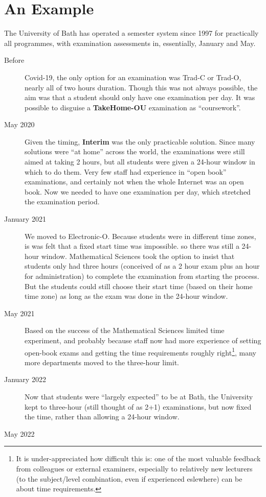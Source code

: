 \documentclass{article}
\begin{document}
\section{An Example}
The University of Bath has operated a semester system since 1997 for practically all programmes, with examination assessments in, essentially, January and May.
\begin{description}
\item[Before]Covid-19, the only option for an examination was Trad-C or Trad-O, nearly all of two hours duration. Though this was not always possible, the aim was that a student should only have one examination per day. It was possible to disguise a {\bf TakeHome-OU} examination as ``coursework''.
\item[May 2020]Given the timing, {\bf Interim} was the only practicable solution. Since many solutions were ``at home'' across the world, the examinations were still aimed at taking 2 hours, but all students were given a 24-hour window in which to do them. Very few staff had experience in ``open book'' examinations, and certainly not when the whole Internet was an open book. Now we needed to have one examination per day, which stretched the examination period.
\item[January 2021]We moved to Electronic-O. Because students were in different time zones, is was felt that a fixed start time was impossible. so there was still a 24-hour window. Mathematical Sciences took the option to insist that students only had three hours (conceived of as a 2 hour exam plus an hour for administration) to complete the examination from starting the process. But the students could still choose their start time (based on their home time zone) as long as the exam was done in the 24-hour window.
\item[May 2021]Based on the success of the Mathematical Sciences limited time experiment, and probably because staff now had more experience of setting open-book exams and getting the time requirements roughly right\footnote{It is under-appreciated how difficult this is: one of the most valuable feedback from colleagues or external examiners, especially to relatively new lecturers (to the subject/level combination, even if experienced eslewhere) can be about time requirements.}, many more departments moved to the three-hour limit.
\item[January 2022]Now that students were ``largely expected'' to be at Bath, the University kept to three-hour (still thought of as 2+1) examinations, but now fixed the time, rather than allowing a 24-hour window.
\item[May 2022]
\end{description}
\end{document}
